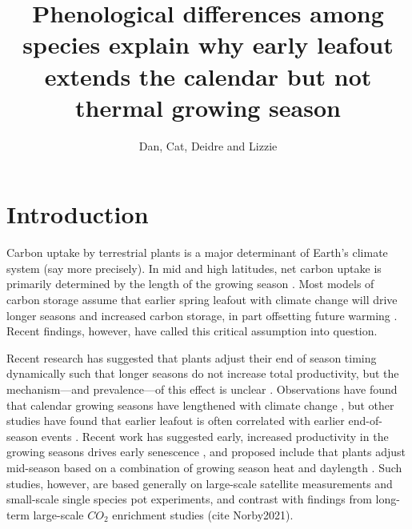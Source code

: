 \documentclass{article}[12pt]
\title{Phenological differences among species explain why early leafout extends the calendar but not thermal growing season}
\author{Dan, Cat, Deidre and Lizzie}
\begin{document}


\maketitle
\setlength{\parindent}{0pt}


\section{Introduction}
Carbon uptake by terrestrial plants is a major determinant of Earth's climate system \citep{} (say more precisely). In mid and high latitudes, net carbon uptake is primarily determined by the length of the growing season \citep{White1999}. Most models of carbon storage assume that earlier spring leafout with climate change will drive longer seasons and increased carbon storage, in part offsetting future warming \citep{Churkina2005,White1999,Keenan2014}. Recent findings, however, have called this critical assumption into question. 

Recent research has suggested that plants adjust their end of season timing dynamically such that longer seasons do not increase total productivity, but the mechanism---and prevalence---of this effect is unclear \citep{Zani2020,Norby2021,Zohner2023}. Observations have found that calendar growing seasons have lengthened with climate change \citep{Menzel1999,Liu2010}, but other studies have found that earlier leafout is often correlated with earlier end-of-season events \citep{Zani2020,Liu2016,Keenan2015}. Recent work has suggested early, increased productivity in the growing seasons drives early senescence \citep{Zani2020}, and proposed include that plants adjust mid-season based on a combination of growing season heat and daylength \citep{Zohner2023}. Such studies, however, are based generally on large-scale satellite measurements and small-scale single species pot experiments, and contrast with findings from long-term large-scale $CO_2$ enrichment studies (cite Norby2021). 
\end{document}
